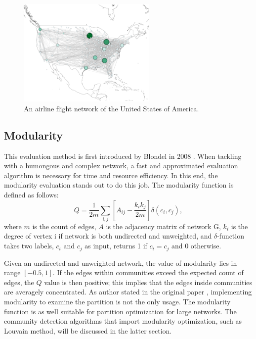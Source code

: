 \documentclass[12pt]{article}
\begin{document}
\begin{figure}
\centering
\includegraphics[width=0.6\textwidth]{fig_2.png}

\caption{\label{fig:fig_2}An airline flight network of the United States of America\cite{11}.}
\end{figure}

\subsection{Modularity}

This evaluation method is first introduced by Blondel in 2008 \cite{12}. When tackling with a humongous and complex network, a fast and approximated evaluation algorithm is necessary for time and resource efficiency. In this end, the modularity evaluation stands out to do this job. The modularity function is defined as follows:
$$ Q = \frac{1}{2m} \sum_{i,j} \left[ A_{i j} - \frac{k_{i}k_{j}}{2m}\right] \delta(c_i, c_j),$$
where $m$ is the count of edges, $A$ is the adjacency matrix of network G, $k_i$ is the degree of vertex i if network is both undirected and unweighted, and $\delta$-function takes two labels, $c_i \text{ and } c_j$ as input, returns 1 if $c_i = c_j$ and 0 otherwise.

\bigbreak

Given an undirected and unweighted network, the value of modularity lies in range $[-0.5, 1]$. If the edges within communities exceed the expected count of edges, the $Q$ value is then positive; this implies that the edges inside communities are averagely concentrated. As author stated in the original paper \cite{12}, implementing modularity to examine the partition is not the only usage. The modularity function is as well suitable for partition optimization for large networks. The community detection algorithms that import modularity optimization, such as Louvain method, will be discussed in the latter section.
\end{document}
